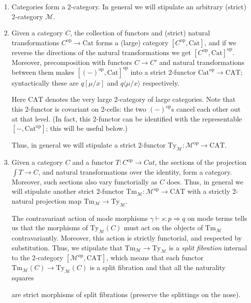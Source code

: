 \documentclass[10pt]{article}
\theoremstyle{definition}
\newcommand{\tcell}{\Rightarrow}
\newcommand\TypeTwo[4]{\ensuremath{#1 \vdash #2 :  #3 \tcell #4}}
\newcommand\ap[2]{\ensuremath{#1 \langle #2 \rangle }}
\newcommand\op{^{\mathrm{op}}}
\newcommand\Cat{\mathrm{Cat}}
\newcommand\CAT{\mathrm{CAT}}
\newcommand\M{\mathcal{M}}
\newcommand\Mty{{\mathrm{Ty}_{\M}}}
\newcommand\Mtm{{\mathrm{Tm}_{\M}}}
\begin{document}
\begin{enumerate}
\item Categories form a 2-category.
  In general we will stipulate an arbitrary (strict) 2-category $\M$.
\item Given a category $C$, the collection of functors and (strict) natural transformations $C\op \to \Cat$ forms a (large) category $[C\op, \Cat]$, and if we reverse the directions of the natural transformations we get $[C\op, \Cat]\op$.
  Moreover, precomposition with functors $C\to C'$ and natural transformations between them makes $[(-)\op, \Cat]\op$ into a strict 2-functor $\Cat\op \to \CAT$; syntactically these are $q[\mu/x]$ and $\ap{q}{\mu/x}$ respectively.

  Here $\CAT$ denotes the very large 2-category of large categories.
  Note that this 2-functor is covariant on 2-cells: the two $(-)\op$s cancel each other out at that level.
  (In fact, this 2-functor can be identified with the representable $[-,\Cat\op]$; this will be useful below.)

  Thus, in general we will stipulate a strict 2-functor $\Mty:\M\op \to \CAT$.
  \addtocounter{enumi}{1}
\item Given a category $C$ and a functor $T:C\op\to Cat$, the sections of the projection $\int T \to C$, and natural transformations over the identity, form a category.
  Moreover, such sections also vary functorially as $C$ does.
  Thus, in general we will stipulate another strict 2-functor $\Mtm : \M\op\to\CAT$ with a strictly 2-natural projection map $\Mtm\to\Mty$.

  The contravariant action of mode morphisms $\TypeTwo{\gamma}{s}{p}{q}$ on mode terms tells us that the morphisms of $\Mty(C)$ must act on the objects of $\Mtm$ contravariantly.
  Moreover, this action is strictly functorial, and respected by substitution.
  Thus, we stipulate that $\Mtm \to \Mty$ is a \emph{split fibration} internal to the 2-category $[\M\op,\CAT]$, which means that each functor $\Mtm(C) \to \Mty(C)$ is a split fibration and that all the naturality squares
  \begin{center}
  \end{center}
  are strict morphisms of split fibrations (preserve the splittings on the nose).


\end{enumerate}
\end{document}
